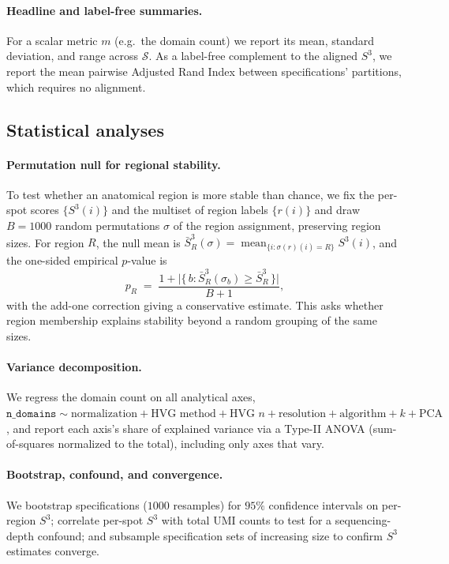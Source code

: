 \paragraph{Headline and label-free summaries.} For a scalar metric $m$ (e.g.\ the domain
count) we report its mean, standard deviation, and range across $\mathcal{S}$. As a
label-free complement to the aligned $S^3$, we report the mean pairwise Adjusted Rand Index
\citep{hubert1985comparing} between specifications' partitions, which requires no alignment.

\subsection{Statistical analyses}
\label{sec:stats}
\paragraph{Permutation null for regional stability.} To test whether an anatomical region is
more stable than chance, we fix the per-spot scores $\{S^3(i)\}$ and the multiset of region
labels $\{r(i)\}$ and draw $B = 1000$ random permutations $\sigma$ of the region assignment,
preserving region sizes. For region $R$, the null mean is $\bar{S}^3_R(\sigma) =
\operatorname{mean}_{\{i : \sigma(r)(i) = R\}} S^3(i)$, and the one-sided empirical $p$-value is
\begin{equation}
  p_R \;=\; \frac{1 + \bigl|\{\, b : \bar{S}^3_R(\sigma_b) \ge \bar{S}^3_R \,\}\bigr|}
  {B + 1},
\end{equation}
with the add-one correction giving a conservative estimate. This asks whether region
membership explains stability beyond a random grouping of the same sizes.

\paragraph{Variance decomposition.} We regress the domain count on all analytical axes,
$\texttt{n\_domains} \sim \text{normalization} + \text{HVG method} + \text{HVG }n +
\text{resolution} + \text{algorithm} + k + \text{PCA}$, and report each axis's share of
explained variance via a Type-II ANOVA (sum-of-squares normalized to the total), including
only axes that vary.

\paragraph{Bootstrap, confound, and convergence.} We bootstrap specifications ($1000$
resamples) for $95\%$ confidence intervals on per-region $S^3$; correlate per-spot $S^3$ with
total UMI counts to test for a sequencing-depth confound; and subsample specification sets of
increasing size to confirm $S^3$ estimates converge.


